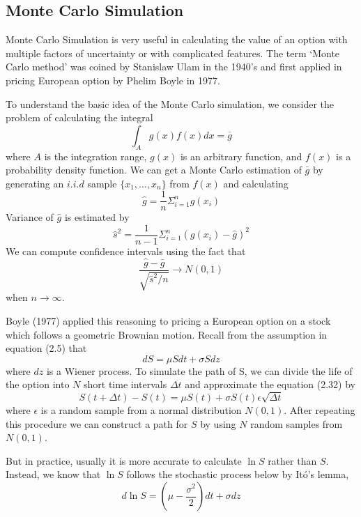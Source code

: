 \documentclass[11pt]{book}
\begin{document}
\subsection{Monte Carlo Simulation}

Monte Carlo Simulation is very useful in calculating the value of an
option with multiple factors of uncertainty or with complicated
features. The term `Monte Carlo method' was coined by Stanislaw Ulam
in the 1940's and first applied in pricing European option by Phelim
Boyle in 1977.

To understand the basic idea of the Monte Carlo simulation, we
consider the problem of calculating the integral
\begin{equation}
\int_A g(x)f(x)dx=\bar{g}
\end{equation}
where $A$ is the integration range,  $g(x)$ is an arbitrary
function, and $f(x)$ is a probability density function. We can get a
Monte Carlo estimation of $\bar{g}$ by generating an $i.i.d$ sample
$\{x_1,\ldots, x_n\}$ from $f(x)$ and calculating
\begin{equation}
\hat{g}=\frac{1}{n}\Sigma_{i=1}^{n}g(x_i)
\end{equation}
Variance of $\hat{g}$ is estimated by
\begin{equation}
\hat{s}^2=\frac{1}{n-1}\Sigma_{i=1}^{n}(g(x_i)-\hat{g})^2
\end{equation}
We can compute confidence intervals using the fact that
\begin{equation}
\frac{\hat{g}-\bar{g}}{\sqrt{\hat{s}^2/n}}\rightarrow N(0,1)
\end{equation}
when $n\rightarrow \infty$.

Boyle (1977) applied this reasoning to pricing a European option on
a stock which follows a geometric Brownian motion. Recall from the
assumption in equation (2.5) that
\begin{equation}
dS=\mu Sdt+\sigma Sdz
\end{equation}
where $dz$ is a Wiener process. To simulate the path of S, we can
divide the life of the option into $N$ short time intervals $\Delta
t$ and approximate the equation (2.32) by
\begin{equation}
S(t+\Delta t)-S(t)=\mu S(t)+\sigma S(t)\epsilon \sqrt{\Delta t}
\end{equation}
where $\epsilon$ is a random sample from a normal distribution
$N(0,1)$. After repeating this procedure we can construct a path for
$S$ by using $N$ random samples from $N(0,1)$.

But in practice, usually it is more accurate to calculate $\ln{S}$
rather than $S$. Instead, we know that $\ln{S}$ follows the
stochastic process below by It\'{o}'s lemma,
\begin{equation}
d\ln{S}=(\mu-\frac{\sigma^2}{2})dt+\sigma dz
\end{equation}
\end{document}
